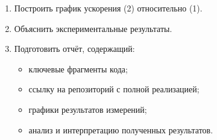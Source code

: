 \documentclass[12pt]{article}
\begin{document}
\begin{enumerate}
    \item Построить график ускорения (2) относительно (1).

    \item Объяснить экспериментальные результаты.

    \item Подготовить отчёт, содержащий:
    \begin{itemize}
        \item ключевые фрагменты кода;
        \item ссылку на репозиторий с полной реализацией;
        \item графики результатов измерений;
        \item анализ и интерпретацию полученных результатов.
    \end{itemize}
\end{enumerate}
\end{document}
